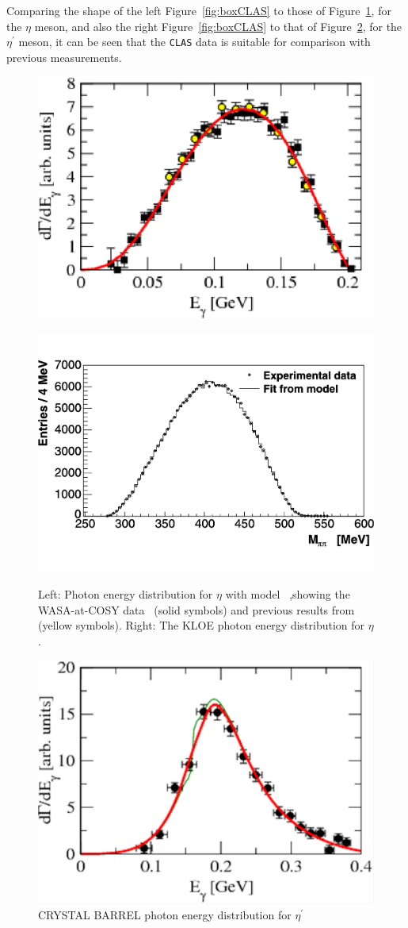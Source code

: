 \documentclass{aip-cp}
\begin{document}
Comparing the shape of the left Figure~\ref{fig:boxCLAS} to those of Figure~\ref{fig:kloe_eta}, for the  $\eta$ meson, and also the right Figure~\ref{fig:boxCLAS} to that of Figure~\ref{fig:crystal_etaP}, for the $\eta^{\prime}$ meson, it can be seen that the \textsc{\texttt{CLAS}} data is suitable for comparison with previous measurements.
\begin{figure}[h!]
	\centering
	\begin{minipage}{.30\textwidth}
		\centering
		\includegraphics[width=125 pt]{figures/WASA_eta.pdf}
		\caption{}{}
		\label{fig:wasa_eta}
	\end{minipage}%
	\centering
	\begin{minipage}{.30\textwidth}
		\centering
		\includegraphics[width=125 pt, height = 100 pt]{figures/KLOE_eta.pdf}
		\caption{Left: Photon energy distribution for $\eta$ with model~\cite{bib3} ,showing the WASA-at-COSY data~\cite{bib0} (solid symbols) and previous results from ~\cite{grom} (yellow symbols). Right: The KLOE photon energy distribution for $\eta$ \cite{bib1}.}{}
		\label{fig:kloe_eta}
	\end{minipage}
\end{figure}
\begin{figure}[h!]
	\centerline{\includegraphics[width=135 pt]{figures/CRYSTAL_etaP.pdf}}
	\caption{CRYSTAL BARREL photon energy distribution for  $\eta^{\prime}$~\cite{bib2}}
	\label{fig:crystal_etaP}
\end{figure}
\end{document}

